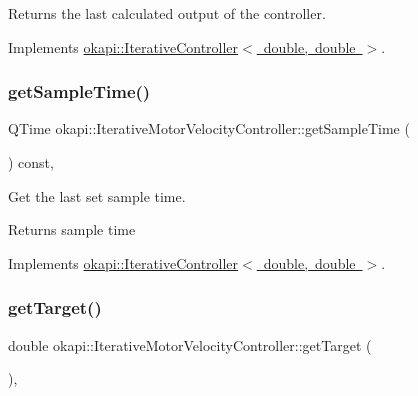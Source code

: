 Returns the last calculated output of the controller. 

Implements \mbox{\hyperlink{classokapi_1_1IterativeController_a83e0aac640804974f0e06936b9f7898a}{okapi\+::\+Iterative\+Controller$<$ double, double $>$}}.

\mbox{\label{classokapi_1_1IterativeMotorVelocityController_ae67b1aec831d3711f12beb85f69eb7f0}} 
\subsubsection{\texorpdfstring{getSampleTime()}{getSampleTime()}}
{\footnotesize\ttfamily Q\+Time okapi\+::\+Iterative\+Motor\+Velocity\+Controller\+::get\+Sample\+Time (\begin{DoxyParamCaption}{ }\end{DoxyParamCaption}) const\hspace{0.3cm}{\ttfamily [override]}, {\ttfamily [virtual]}}

Get the last set sample time.

\begin{DoxyReturn}{Returns}
sample time 
\end{DoxyReturn}


Implements \mbox{\hyperlink{classokapi_1_1IterativeController_a48cd86626af7036db4f36b4124df4f98}{okapi\+::\+Iterative\+Controller$<$ double, double $>$}}.

\mbox{\label{classokapi_1_1IterativeMotorVelocityController_a3e54865f6b424954f3846cd1361077c5}} 
\subsubsection{\texorpdfstring{getTarget()}{getTarget()}}
{\footnotesize\ttfamily double okapi\+::\+Iterative\+Motor\+Velocity\+Controller\+::get\+Target (\begin{DoxyParamCaption}{ }\end{DoxyParamCaption})\hspace{0.3cm}{\ttfamily [override]}, {\ttfamily [virtual]}}


